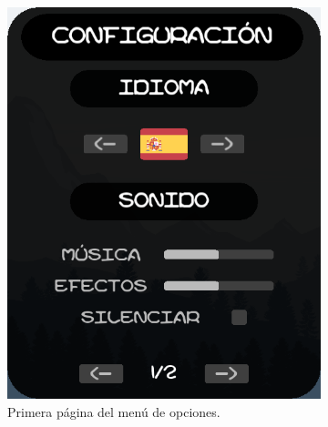 \documentclass[12pt, spanish]{article}
\begin{document}
\begin{figure}[H]
    \centering
	 \begin{subfigure}[b]{0.49\textwidth}
		 \centering
		 \includegraphics[width=\textwidth]{"opciones/pagina1_opciones.png"}
		 \caption{Primera página del menú de opciones.}\label{fig:pagina1_opciones}
	 \end{subfigure}
	 \begin{subfigure}[b]{0.49\textwidth}
		 \centering

\end{subfigure}
\end{figure}
\end{document}
